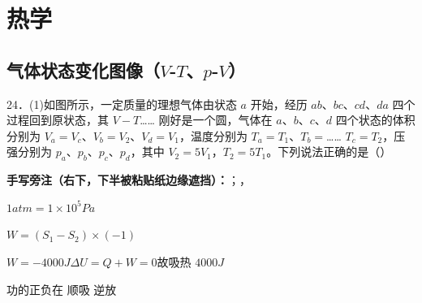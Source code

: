 \chapter{热学}
\label{ch:16}

\section{气体状态变化图像（$V$-$T$、$p$-$V$）}
\begin{problem}[粘贴印刷题 24(1)]
24．(1)如图所示，一定质量的理想气体由状态 $a$ 开始，经历 $ab$、$bc$、$cd$、$da$ 四个过程回到原状态，其 $V-T$……%
刚好是一个圆，气体在 $a$、$b$、$c$、$d$ 四个状态的体积分别为 $V_a=V_c$、$V_b=V_2$、$V_d=V_1$，温度分别为 $T_a=T_1$、$T_b=$……%
$T_c=T_2$，压强分别为 $p_a$、$p_b$、$p_c$、$p_d$，其中 $V_2=5V_1$，$T_2=5T_1$。下列说法正确的是（\qquad）

\medskip
\noindent\textbf{手写旁注（右下，下半被粘贴纸边缘遮挡）：}；，%
\end{problem}

\begin{problem}
\begin{solution}
$1\unit{atm}=1\times10^5\unit{Pa}$

$W=$$(S_1-S_2)\times(-1)$ %

$W=-4000\unit{J}$\quad $\Delta U=Q+W=0$\quad 故吸热 $4000\unit{J}$
\end{solution}
\end{problem}
功的正负\quad 在 顺吸 逆放

